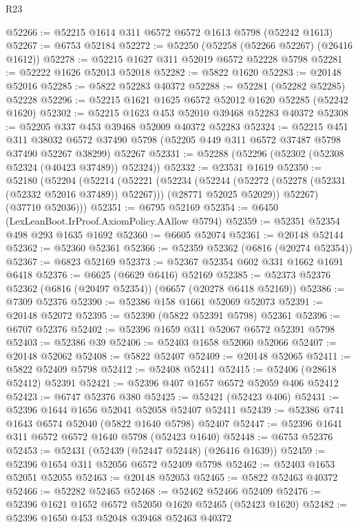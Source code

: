 \begin{lexlean}{R23}
\begin{coremodule}
@52266 := @52215 @1614 @311 @6572 @6572 @1613 @5798 (@52242 @1613)
@52267 := @6753 @52184
@52272 := @52250 (@52258 (@52266 @52267) (@26416 @1612))
@52278 := @52215 @1627 @311 @52019 @6572 @52228 @5798
@52281 := @52222 @1626 @52013 @52018
@52282 := @5822 @1620
@52283 := @20148 @52016
@52285 := @5822 @52283 @40372
@52288 := @52281 (@52282 @52285) @52228
@52296 := @52215 @1621 @1625 @6572 @52012 @1620 @52285 (@52242 @1620)
@52302 := @52215 @1623 @453 @52010 @39468 @52283 @40372
@52308 := @52205 @337 @453 @39468 @52009 @40372 @52283
@52324 := @52215
    @451
    @311
    @38032
    @6572
    @37490
    @5798
    (@52205 @449 @311 @6572 @37487 @5798 @37490 @52267 @38299)
    @52267
@52331 := @52288 (@52296 (@52302 (@52308 @52324 (@40423 @37489)) @52324))
@52332 := @23531 @1619
@52350 := @52180
    (@52204
      (@52214
        (@52221
          (@52234
            (@52244 (@52272 (@52278 (@52331 (@52332 @52016 @37489)) @52267)))
            (@28771 @52025 @52029))
          @52267)
        (@37710 @52036)))
@52351 := @6795 @52169
@52354 := @6450 (LexLeanBoot.IrProof.AxiomPolicy.AAllow @5794)
@52359 := @52351 @52354 @498 @293 @1635 @1692
@52360 := @6605 @52074
@52361 := @20148 @52144
@52362 := @52360 @52361
@52366 := @52359 @52362 (@6816 (@20274 @52354))
@52367 := @6823 @52169
@52373 := @52367 @52354 @602 @331 @1662 @1691 @6418
@52376 := @6625 (@6629 @6416) @52169
@52385 := @52373 @52376 @52362 (@6816 (@20497 @52354)) (@6657 (@20278 @6418 @52169))
@52386 := @7309 @52376
@52390 := @52386 @158 @1661 @52069 @52073
@52391 := @20148 @52072
@52395 := @52390 (@5822 @52391 @5798) @52361
@52396 := @6707 @52376
@52402 := @52396 @1659 @311 @52067 @6572 @52391 @5798
@52403 := @52386 @39
@52406 := @52403 @1658 @52060 @52066
@52407 := @20148 @52062
@52408 := @5822 @52407
@52409 := @20148 @52065
@52411 := @5822 @52409 @5798
@52412 := @52408 @52411
@52415 := @52406 (@28618 @52412) @52391
@52421 := @52396 @407 @1657 @6572 @52059 @406 @52412
@52423 := @6747 @52376 @380
@52425 := @52421 (@52423 @406)
@52431 := @52396 @1644 @1656 @52041 @52058 @52407 @52411
@52439 := @52386 @741 @1643 @6574 @52040 (@5822 @1640 @5798) @52407
@52447 := @52396 @1641 @311 @6572 @6572 @1640 @5798 (@52423 @1640)
@52448 := @6753 @52376
@52453 := @52431 (@52439 (@52447 @52448) (@26416 @1639))
@52459 := @52396 @1654 @311 @52056 @6572 @52409 @5798
@52462 := @52403 @1653 @52051 @52055
@52463 := @20148 @52053
@52465 := @5822 @52463 @40372
@52466 := @52282 @52465
@52468 := @52462 @52466 @52409
@52476 := @52396 @1621 @1652 @6572 @52050 @1620 @52465 (@52423 @1620)
@52482 := @52396 @1650 @453 @52048 @39468 @52463 @40372

\end{coremodule}
\end{lexlean}
